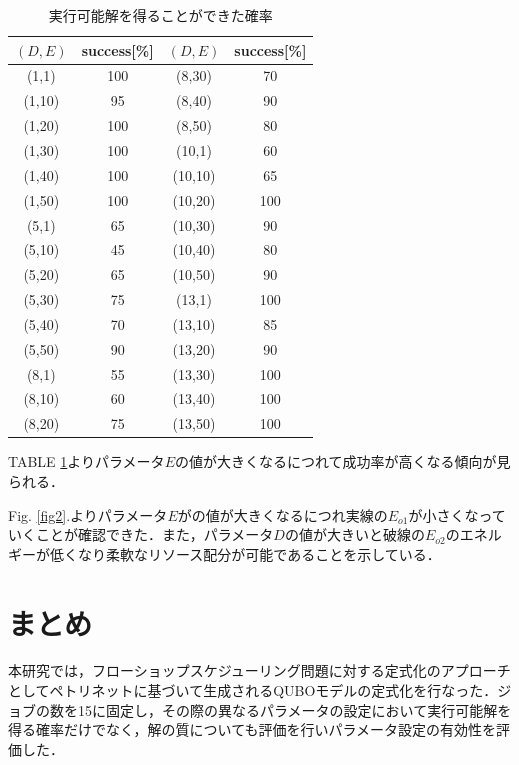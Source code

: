\documentclass[conference]{IEEEtran}
\begin{document}
\begin{table}[h]
    \centering
    \caption{実行可能解を得ることができた確率}
    \label{feasible}
    \begin{tabular}{|c|c|c|c|}
        \hline
        $(D,E)$ & success[\%] & $(D,E)$ & success[\%] \\ \hline
        (1,1) & 100 & (8,30) & 70 \\ \hline
        (1,10) & 95 & (8,40) & 90 \\ \hline
        (1,20) & 100 & (8,50) & 80 \\ \hline
        (1,30) & 100 & (10,1) & 60 \\ \hline
        (1,40) & 100 & (10,10) & 65 \\ \hline
        (1,50)  & 100 & (10,20)  & 100 \\ \hline
        (5,1)  & 65 & (10,30) & 90 \\ \hline
        (5,10)  & 45 & (10,40) & 80 \\ \hline
        (5,20)  & 65 & (10,50) & 90 \\ \hline
        (5,30)  & 75 & (13,1) & 100 \\ \hline
        (5,40)  & 70 & (13,10) & 85 \\ \hline
        (5,50)   & 90 & (13,20) & 90 \\ \hline
        (8,1)   & 55 & (13,30) & 100 \\ \hline
        (8,10)   & 60 & (13,40) & 100 \\ \hline
        (8,20)   & 75 & (13,50) & 100 \\ \hline
    \end{tabular}
\end{table}



TABLE \ref{feasible}よりパラメータ$E$の値が大きくなるにつれて成功率が高くなる傾向が見られる．

Fig. \ref{fig2}.よりパラメータ$E$がの値が大きくなるにつれ実線の$E_{o1}$が小さくなっていくことが確認できた．また，パラメータ$D$の値が大きいと破線の$E_{o2}$のエネルギーが低くなり柔軟なリソース配分が可能であることを示している．

\clearpage

\section{まとめ}
本研究では，フローショップスケジューリング問題に対する定式化のアプローチとしてペトリネットに基づいて生成されるQUBOモデルの定式化を行なった．ジョブの数を15に固定し，その際の異なるパラメータの設定において実行可能解を得る確率だけでなく，解の質についても評価を行いパラメータ設定の有効性を評価した．
\end{document}
